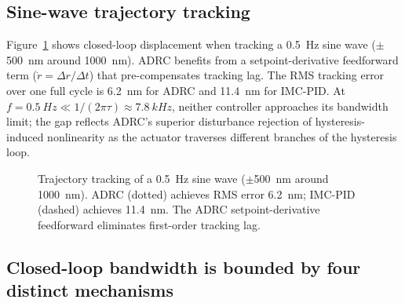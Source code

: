 \documentclass[fleqn,10pt]{wlscirep}
\begin{document}
\subsection*{Sine-wave trajectory tracking}

Figure~\ref{fig:traj} shows closed-loop displacement when tracking a \SI{0.5}{Hz} sine wave ($\pm$\SI{500}{nm} around \SI{1000}{nm}). ADRC benefits from a setpoint-derivative feedforward term ($\dot{r} = \Delta r / \Delta t$) that pre-compensates tracking lag. The RMS tracking error over one full cycle is \SI{6.2}{nm} for ADRC and \SI{11.4}{nm} for IMC-PID. At $f = \SI{0.5}{Hz} \ll 1/(2\pi\tau) \approx \SI{7.8}{kHz}$, neither controller approaches its bandwidth limit; the gap reflects ADRC's superior disturbance rejection of hysteresis-induced nonlinearity as the actuator traverses different branches of the hysteresis loop.

\begin{figure}[ht]
    \centering
    \caption{Trajectory tracking of a \SI{0.5}{Hz} sine wave ($\pm$\SI{500}{nm} around \SI{1000}{nm}). ADRC (dotted) achieves RMS error \SI{6.2}{nm}; IMC-PID (dashed) achieves \SI{11.4}{nm}. The ADRC setpoint-derivative feedforward eliminates first-order tracking lag.}
    \label{fig:traj}
\end{figure}

\subsection*{Closed-loop bandwidth is bounded by four distinct mechanisms}
\end{document}

